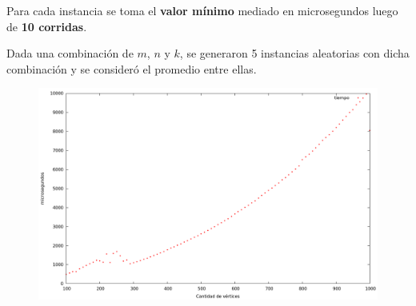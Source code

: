 Para cada instancia se toma el \textbf{valor mínimo} mediado en microsegundos luego de \textbf{10 corridas}.

Dada una combinación de $m$, $n$ y $k$, se generaron 5 instancias aleatorias con dicha combinación y se consideró el promedio entre ellas.

\vspace*{0.5cm}

\begin{figure}[h]
  \begin{center}
    \includegraphics[scale=0.35]{imagenes/grafico-greedy.png}
  \end{center}
\end{figure}

\vspace{0.5cm}


